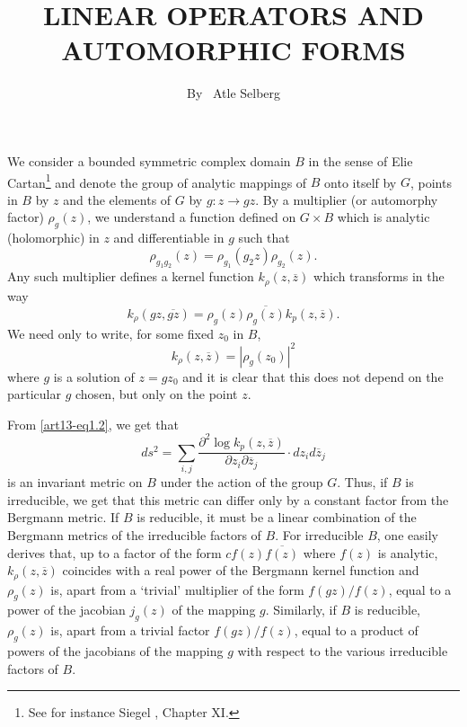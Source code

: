 \title{LINEAR OPERATORS AND AUTOMORPHIC FORMS}

\author{By~ Atle Selberg}

\date{}
\maketitle

\setcounter{page}{241} 
\setcounter{pageoriginal}{202}
\section{}\label{art13-sec1}\pageoriginale
We consider a bounded symmetric complex domain $B$ in the sense of Elie Cartan\footnote{See for instance Siegel \cite{art13-key5}, Chapter XI.} and denote the group of analytic mappings of $B$ onto itself by $G$, points in $B$ by $z$ and the elements of $G$ by $g:z\to gz$. By a multiplier (or automorphy factor) $\rho_{g}(z)$, we understand a function defined on $G\times B$ which is analytic (holomorphic) in $z$ and differentiable in $g$ such that
\begin{equation}
\rho_{g_{1}g_{2}}(z)=\rho_{g_{1}}(g_{2}z)\rho_{g_{2}}(z).\label{art13-eq1.1}
\end{equation}
Any such multiplier defines a kernel function $k_{\rho}(z,\overline{z})$ which transforms in the way
\begin{equation}
k_{\rho}(gz,\overline{gz})=\rho_{g}(z)\overline{\rho_{g}(z)}k_{p}(z,\overline{z}).\label{art13-eq1.2}
\end{equation}
We need only to write, for some fixed $z_{0}$ in $B$,
$$
k_{\rho}(z,\overline{z})=|\rho_{g}(z_{0})|^{2}
$$
where $g$ is a solution of $z=gz_{0}$ and it is clear that this does not depend on the particular $g$ chosen, but only on the point $z$.

From \eqref{art13-eq1.2}, we get that
$$
ds^{2}=\sum\limits_{i,j}\frac{\partial^{2}\log k_{p}(z,\overline{z})}{\partial z_{i}\partial\overline{z}_{j}}\cdot dz_{i}d\overline{z}_{j}
$$
is an invariant metric on $B$ under the action of the group $G$. Thus, if $B$ is irreducible, we get that this metric can differ only by a constant factor from the Bergmann metric. If $B$ is reducible, it must be a linear combination of the Bergmann metrics of the irreducible factors of $B$. For irreducible $B$, one easily derives that, up to a factor of the form $cf(z)\overline{f(z)}$ where $f(z)$ is analytic, $k_{\rho}(z,\overline{z})$ coincides with a real power of the Bergmann kernel function and $\rho_{g}(z)$ is, apart from a `trivial' multiplier of the form $f(gz)/f(z)$, equal to a power of the jacobian $j_{g}(z)$ of the mapping $g$. Similarly, if $B$ is reducible, $\rho_{g}(z)$ is, apart from a trivial factor $f(gz)/f(z)$, equal to a product of powers of the jacobians of the mapping $g$ with respect to the various irreducible factors of $B$. 

